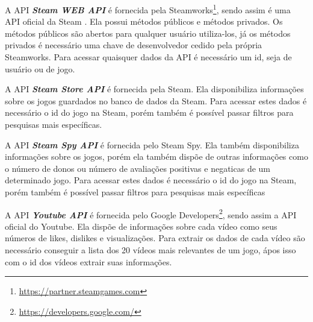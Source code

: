 A API \textit{\textbf{Steam WEB API}} é fornecida pela Steamworks\footnote[4]{\url{https://partner.steamgames.com}}, sendo assim é uma API oficial da Steam \cite{steam_api}. Ela possui métodos públicos e métodos privados. Os métodos públicos são abertos para qualquer usuário utiliza-los, já os métodos privados é necessário uma chave de desenvolvedor cedido pela própria Steamworks. Para acessar quaisquer dados da API é necessário um id, seja de usuário ou de jogo.

A API \textit{\textbf{Steam Store API}} é fornecida pela Steam. Ela disponibiliza informações sobre os jogos guardados no banco de dados da Steam. Para acessar estes dados é necessário o id do jogo na Steam, porém também é possível passar filtros para pesquisas mais específicas.

A API \textit{\textbf{Steam Spy API}} é fornecida pelo Steam Spy. Ela também disponibiliza informações sobre os jogos, porém ela também dispõe de outras informações como o número de donos ou número de avaliações positivas e negaticas de um determinado jogo. Para acessar estes dados é necessário o id do jogo na Steam, porém também é possível passar filtros para pesquisas mais específicas

A API \textit{\textbf{Youtube API}} é fornecida pelo Google Developers\footnote[5]{\url{https://developers.google.com/}}, sendo assim a API oficial do Youtube. Ela dispõe de informações sobre cada vídeo como seus números de likes, dislikes e visualizações. Para extrair os dados de cada vídeo são necessário conseguir a lista dos 20 vídeos mais relevantes de um jogo, ápos isso com o id dos vídeos extrair suas informações.

